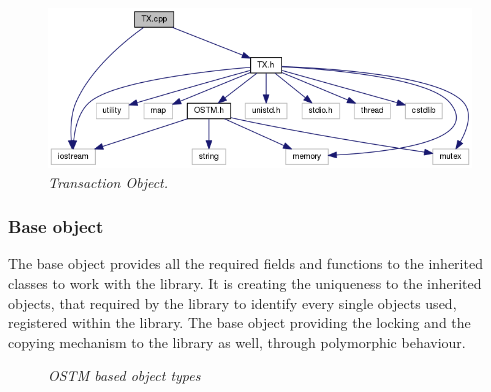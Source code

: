\documentclass[12pt]{article}
\begin{document}
\begin{figure}[h!]
\centering
\includegraphics[scale=0.6]{Pictures/TX.png}
\caption*{\textit{\color{gray}Transaction Object.}}
\end{figure}

\subsubsection{Base object}
The base object provides all the required fields and functions to the inherited classes to work with the library. It is creating the uniqueness to the inherited objects, that required by the library to identify every single objects used, registered within the library. The base object providing the locking and the copying mechanism to the library as well, through polymorphic behaviour. 

\begin{figure}%
    \centering
    \qquad
    \caption*{\textit{\color{gray}OSTM based object types}}%
    \label{fig:example}%
\end{figure}
\end{document}
